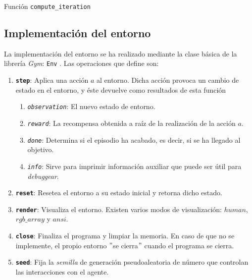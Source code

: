 \begin{enumerate}
\begin{algorithm}[H]
{    
}
 \caption{Función \texttt{compute\_iteration}} \label{compute_iteration}
\end{algorithm}
\end{enumerate}

\subsection{Implementación del entorno}

La implementación del entorno se ha realizado mediante la clase básica de la librería \textit{Gym}: \texttt{Env} \cite{gymCore}. Las operaciones que define son:

\begin{enumerate}
    \item \texttt{\textbf{step}}: Aplica una acción $a$ al entorno. Dicha acción provoca un cambio de estado en el entorno, y éste devuelve como resultados de esta función
    \begin{enumerate}
        \item \texttt{\textit{observation}}: El nuevo estado de entorno.
        \item \texttt{\textit{reward}}: La recompensa obtenida a raíz de la realización de la acción $a$.
        \item \texttt{\textit{done}}: Determina si el episodio ha acabado, es decir, si se ha llegado al objetivo. 
        \item \texttt{\textit{info}}: Sirve para imprimir información auxiliar que puede ser útil para \textit{debuggear}. 
    \end{enumerate}
    \item \texttt{\textbf{reset}}: Resetea el entorno a su estado inicial y retorna dicho estado. 
    \item \texttt{\textbf{render}}: Visualiza el entorno. Existen varios modos de visualización: $human$, $rgb\_array$ y $ansi$.
    \item \texttt{\textbf{close}}: Finaliza el programa y limpiar
    la memoria. En caso de que no se implemente, el propio entorno $"$se cierra$"$ cuando el programa se cierra. 
    \item \texttt{\textbf{seed}}: Fija la \textit{semilla} de generación pseudoaleatoria de número que controlan las interacciones con el agente. 
\end{enumerate}

